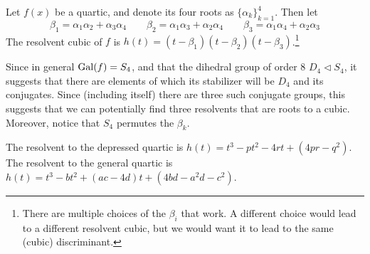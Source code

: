 \begin{definition}
    Let \(f(x)\) be a quartic, and denote its four roots as \({\{\alpha_k\}}_{k=1}^4\).
    Then let
    \begin{equation*}
        \beta_1 = \alpha_1\alpha_2 + \alpha_3\alpha_4 \qquad
        \beta_2 = \alpha_1\alpha_3 + \alpha_2\alpha_4 \qquad
        \beta_3 = \alpha_1\alpha_4 + \alpha_2\alpha_3
    \end{equation*}
    The resolvent cubic of \(f\) is \(h(t) = (t-\beta_1)(t-\beta_2)(t-\beta_3)\).\footnote{%
        There are multiple choices of the \(\beta_i\) that work.
        A different choice would lead to a different resolvent cubic,
        but we would want it to lead to the same (cubic) discriminant.
    }
\end{definition}
\begin{remark}
    Since in general \(\operatorname{Gal}(f) = S_4\), and that the dihedral group of order 8 \(D_4 \lhd S_4\),
    it suggests that there are elements of which its stabilizer will be \(D_4\) and its conjugates.
    Since (including itself) there are three such conjugate groups,
    this suggests that we can potentially find three resolvents that are roots to a cubic.
    Moreover, notice that \(S_4\) permutes the \(\beta_k\).
\end{remark}
\begin{proposition}
    The resolvent to the depressed quartic is \(h(t) = t^3 - pt^2 - 4rt + (4pr-q^2)\).
    The resolvent to the general quartic is \(h(t) = t^3 - bt^2 + (ac-4d)t + (4bd-a^2d-c^2)\).
\end{proposition}
